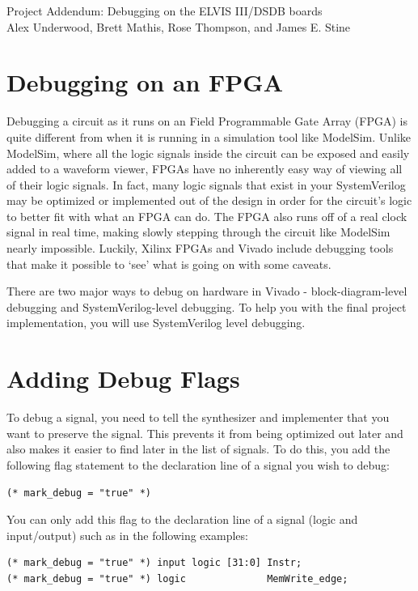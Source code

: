 \documentclass{article}
\newcommand{\myassignment}{Project Addendum: Debugging on the ELVIS III/DSDB boards}
\newcommand{\myinstructor}{Alex Underwood, Brett Mathis, Rose Thompson, and James E. Stine}
\begin{document}
\graphicspath{{.}{./latex_graphics/}}
\begin{center}
  {\huge \myassignment} \\
  \myinstructor \\
\end{center}

\section{Debugging on an FPGA}
Debugging a circuit as it runs on an Field Programmable Gate Array (FPGA)
is quite different from when
it is running in a simulation tool like ModelSim.  Unlike ModelSim,
where all the logic signals inside the circuit can be exposed and
easily added to a waveform viewer, FPGAs have no inherently easy way
of viewing all of their logic signals.  In fact, many logic signals
that exist in your SystemVerilog may be optimized or implemented out of the
design in order for the circuit's logic to better fit with what an
FPGA can do.  The FPGA also runs off of a real clock signal in real
time, making slowly stepping through the circuit like ModelSim nearly
impossible.  Luckily, Xilinx FPGAs and Vivado include debugging tools
that make it possible to `see' what is going on with some caveats.

There are two major ways to debug on hardware in Vivado -
block-diagram-level debugging and SystemVerilog-level debugging.  To
help you with the final project implementation,
you will use SystemVerilog level debugging.

\section{Adding Debug Flags}
To debug a signal, you need to tell the synthesizer and implementer
that you want to preserve the signal.  This prevents it from being
optimized out later and also makes it easier to find later in the list
of signals.  To do this, you add the following flag statement to the
declaration line of a signal you wish to debug:
\begin{verbatim}
(* mark_debug = "true" *)
\end{verbatim}
You can only add this flag to the declaration line of a signal
(logic and input/output) such as in the following examples:
\begin{verbatim}
(* mark_debug = "true" *) input logic [31:0] Instr;
(* mark_debug = "true" *) logic              MemWrite_edge;
\end{verbatim}
	
\end{document}
